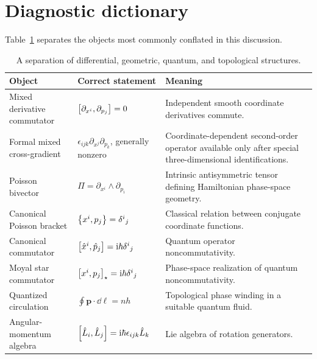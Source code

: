 \section{Diagnostic dictionary}

Table~\ref{tab:dictionary} separates the objects most commonly conflated in this discussion.

\begin{table}[ht]
\centering
\small
\renewcommand{\arraystretch}{1.35}
\begin{tabular}{>{\raggedright\arraybackslash}p{}
                >{\raggedright\arraybackslash}p{}
                >{\raggedright\arraybackslash}p{}}
\toprule
\textbf{Object} & \textbf{Correct statement} & \textbf{Meaning} \\
\midrule
Mixed derivative commutator
& \(\left[\partial_{x^i},\partial_{p_j}\right]=0\)
& Independent smooth coordinate derivatives commute. \\
Formal mixed cross-gradient
& \(\epsilon_{ijk}\partial_{x^j}\partial_{p_k}\), generally nonzero
& Coordinate-dependent second-order operator available only after special three-dimensional identifications. \\
Poisson bivector
& \(\Pi=\partial_{x^i}\wedge\partial_{p_i}\)
& Intrinsic antisymmetric tensor defining Hamiltonian phase-space geometry. \\
Canonical Poisson bracket
& \(\left\{x^i,p_j\right\}=\delta^i{}_j\)
& Classical relation between conjugate coordinate functions. \\
Canonical commutator
& \(\left[\hat x^i,\hat p_j\right]=\mathrm{i}\hbar\delta^i{}_j\)
& Quantum operator noncommutativity. \\
Moyal star commutator
& \(\left[x^i,p_j\right]_{\star}=\mathrm{i}\hbar\delta^i{}_j\)
& Phase-space realization of quantum noncommutativity. \\
Quantized circulation
& \(\oint \bm{p}\cdot\dd\bm{\ell}=nh\)
& Topological phase winding in a suitable quantum fluid. \\
Angular-momentum algebra
& \(\left[\hat L_i,\hat L_j\right]=\mathrm{i}\hbar\epsilon_{ijk}\hat L_k\)
& Lie algebra of rotation generators. \\
\bottomrule
\end{tabular}
\caption{A separation of differential, geometric, quantum, and topological structures.}
\label{tab:dictionary}
\end{table}

